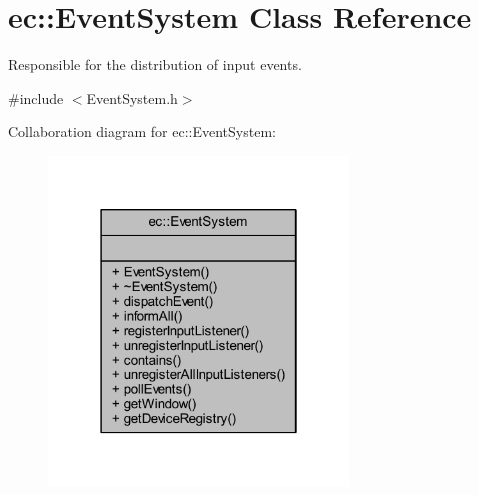 \hypertarget{classec_1_1_event_system}{}\section{ec\+:\+:Event\+System Class Reference}
\label{classec_1_1_event_system}


Responsible for the distribution of input events.  




{\ttfamily \#include $<$Event\+System.\+h$>$}



Collaboration diagram for ec\+:\+:Event\+System\+:\nopagebreak
\begin{figure}[H]
\begin{center}
\leavevmode
\includegraphics[width=226pt]{classec_1_1_event_system__coll__graph}
\end{center}
\end{figure}

